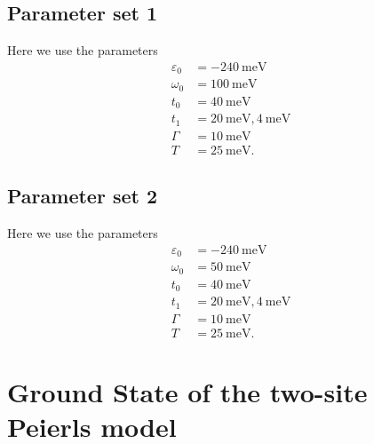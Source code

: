\documentclass{article}
\begin{document}
\subsection{Parameter set 1}
Here we use the parameters
\begin{align}
	\varepsilon_0 &= -\SI{240}{\milli\electronvolt}\\
	\omega_0 &= \SI{100}{\milli\electronvolt}\\
	t_0 &= \SI{40}{\milli\electronvolt}\\
	t_1 &= \SI{20}{\milli\electronvolt}, \SI{4}{\milli\electronvolt}\\
	\Gamma &= \SI{10}{\milli\electronvolt}\\
	T &= \SI{25}{\milli\electronvolt}.
\end{align}
\subsection{Parameter set 2}
Here we use the parameters
\begin{align}
	\varepsilon_0 &= -\SI{240}{\milli\electronvolt}\\
	\omega_0 &= \SI{50}{\milli\electronvolt}\\
	t_0 &= \SI{40}{\milli\electronvolt}\\
	t_1 &= \SI{20}{\milli\electronvolt},\SI{4}{\milli\electronvolt}\\
	\Gamma &= \SI{10}{\milli\electronvolt}\\
	T &= \SI{25}{\milli\electronvolt}.
\end{align}
\section{Ground State of the two-site Peierls model}
\end{document}
